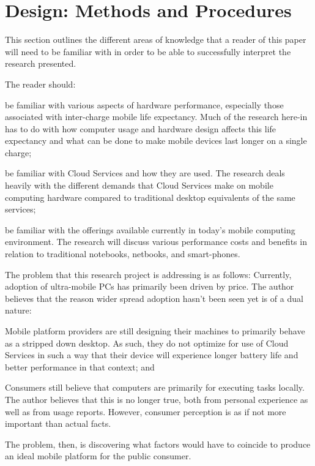 \section{Design: Methods and Procedures}

This section outlines the different areas of knowledge that a reader of this
paper will need to be familiar with in order to be able to successfully
interpret the research presented.

The reader should:
\begin{inparaenum}[(1)]
\item be familiar with various aspects of hardware performance, especially those
  associated with inter-charge mobile life expectancy.  Much of the research
  here-in has to do with how computer usage and hardware design affects this
  life expectancy and what can be done to make mobile devices last longer on a
  single charge;
\item be familiar with Cloud Services and how they are used.  The research deals
  heavily with the different demands that Cloud Services make on mobile
  computing hardware compared to traditional desktop equivalents of the same
  services;
\item be familiar with the offerings available currently in today's mobile
  computing environment.  The research will discuss various performance costs
  and benefits in relation to traditional notebooks, netbooks, and smart-phones.
\end{inparaenum}

The problem that this research project is addressing is as follows: Currently,
adoption of ultra-mobile PCs has primarily been driven by price.  The author
believes that the reason wider spread adoption hasn't been seen yet is of a dual
nature:
\begin{inparaenum}[(1)]
\item Mobile platform providers are still designing their machines to primarily
  behave as a stripped down desktop.  As such, they do not optimize for use of
  Cloud Services in such a way that their device will experience longer battery
  life and better performance in that context; and
\item Consumers still believe that computers are primarily for executing tasks
  locally.  The author believes that this is no longer true, both from personal
  experience as well as from usage reports.  However, consumer perception is as
  if not more important than actual facts.
\end{inparaenum}
The problem, then, is discovering what factors would have to coincide to produce
an ideal mobile platform for the public consumer.

